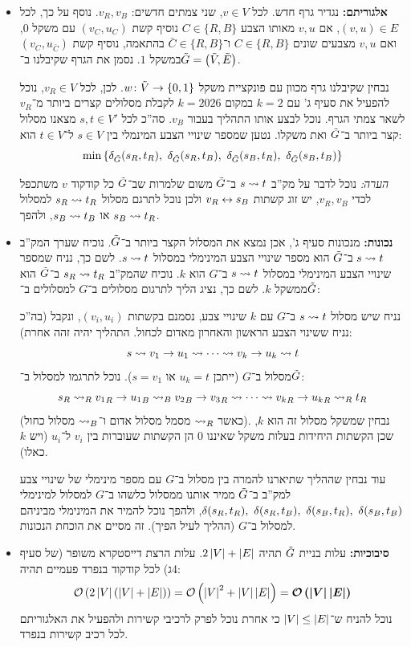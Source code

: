 \documentclass[]{../../../../tex/classes/homework}
\begin{document}
	\begin{itemize}
		\item \textbf{אלגוריתם: }נגדיר גרף חדש. לכל $v \in V$, שני צמתים חדשים: $v_R, v_B$. נוסף על כך, לכל $(v, u) \in E$, אם $v, u$ מאותו הצבע $C \in \{R, B\}$ נוסיף קשת $(v_C, u_C)$ עם משקל $0$, ואם $v, u$ מצבעים שונים $C \in \{R, B\}$ ו־$\bar C \in \{R, B\}$ בהתאמה, נוסיף קשת $(v_C, u_{\bar C})$ במשקל $1$. נסמן את הגרף שקיבלנו ב־$\tilde G = \left ( \tilde V, \tilde E \right )$. 
		
		נבחין שקיבלנו גרף מכוון עם פונקציית משקל $w \colon \tilde V \to \{0, 1\}$. לכן, לכל $v_R \in V$, נוכל להפעיל את סעיף ג' עם $k = 2$ במקום $k = 2026$ לקבלת מסלולים קצרים ביותר מ־$v_R$ לשאר צמתי הגרף. נוכל לבצע אותו התהליך בעבור $v_B$. סה''כ לכל $s, t \in V'$ מצאנו מסלול קצר ביותר ב־$\tilde G$ ואת משקלו. נטען שמספר שינויי הצבע המינמלי בין $s \in V$ ל־$t \in V$ הוא: 
		\[ \min\ccb{\dg_{\tl G}(s_R, t_R),\ \dg_{\tl G}(s_R, t_B),\ \dg_{\tl G}(s_B, t_R),\ \dg_{\tl G}(s_B, t_B)} \]
		
		\textit{הערה: }נוכל לדבר על מק''ב $s \rightsquigarrow t$ ב־$\tilde G$ משום שלמרות שב־$\tilde G$ כל קודקוד $v$ משתכפל לכדי $v_R, v_B$, יש זוג קשתות $v_R \leftrightarrow s_B$ ולכן נוכל לתרגם מסלול $s_R \rightsquigarrow t_R$ למסלול $s_B \rightsquigarrow t_R$ או $s_B \rightsquigarrow t_B$, ולהפך. 
		\item \textbf{נכונות: }מנכונות סעיף ג', אכן נמצא את המסלול הקצר ביותר ב־$\tilde G$. נוכיח שערך המק''ב $s \rightsquigarrow t$ ב־$\tilde G$ הוא מספר שינויי הצבע המינימלי במסלול $s \rightsquigarrow t$. 
		לשם כך, נניח שמספר שינויי הצבע המינימלי במסלול $s \rightsquigarrow t$ ב־$G$ הוא $k$. נוכיח שהמק''ב $s_R \rightsquigarrow t_R$ ב־$\tilde G$ הוא ממשקל $k$. לשם כך, נציג הליך לתרגום מסלולים ב־$G$ למסלולים ב־$\tilde G$: 
		
			 נניח שיש מסלול $s \rightsquigarrow t$ ב־$G$ עם $k$ שינויי צבע, נסמנם בקשתות $(v_i, u_i)$, ונקבל (בה''כ נניח ששינוי הצבע הראשון והאחרון מאדום לכחול. התהליך יהיה זהה אחרת): 
			\[ s \rightsquigarrow v_1 \to u_1 \rightsquigarrow \cdots \rightsquigarrow v_k \to u_k \rightsquigarrow t \]
			מסלול ב־$G$ (ייתכן $u_k = t$ או $s = v_1$). נוכל לתרגמו למסלול ב־$\tilde G$: 
			\[ s_R \rightsquigarrow_R {v_1}_R \to {u_1}_{B} \rightsquigarrow_B {v_2}_B \to {v_3}_R \rightsquigarrow \cdots \rightsquigarrow {v_k}_R \to {u_k}_R \rightsquigarrow_R t_R \]
			(כאשר $\rightsquigarrow_R$ מסמל מסלול אדום ו־$\rightsquigarrow_B$ מסלול כחול). נבחין שמשקל מסלול זה הוא $k$, שכן הקשתות היחידות בעלות משקל שאיננו $0$ הן הקשתות שעוברות בין $v_i$ ל־$u_i$ (ויש $k$ כאלו). 
			
			עוד נבחין שההליך שתיארנו להמרה בין מסלול ב־$G$ עם מספר מינימלי של שינויי צבע למק''ב ב־$\tilde G$ ממיר אותנו ממסלול כלשהו ב־$G$ למסלול למינימלי $\delta(s_R, t_R),\ \delta(s_R, t_B),\ \delta(s_B, t_R),\ \delta(s_B, t_B)$, ולהפך נוכל להמיר את המינימלי מביניהם למסלול ב־$G$ (ההליך לעיל הפיך). זה מסיים את הוכחת הנכונות. 
		\item \textbf{סיבוכיות: }עלות בניית $\tilde G$ תהיה $2 \left \lvert V \right \rvert + \left \lvert E \right \rvert$. עלות הרצת דייסטקרא משופר (של סעיף 4ג) לכל קודקוד בנפרד פעמיים תהיה: 
		\[ \mathcal{O}\left ( 2\left \lvert V \right \rvert \left ( \left \lvert V \right \rvert + \left \lvert E \right \rvert \right ) \right ) = \mathcal{O}\left ( \left \lvert V \right \rvert^{2} + \left \lvert V \right \rvert \left \lvert E \right \rvert \right ) = \bm{\mathcal{O}\left ( {\left \lvert V \right \rvert \left \lvert E \right \rvert} \right )} \]
		נוכל להניח ש־$\left \lvert V \right \rvert \le \left \lvert E \right \rvert$ כי אחרת נוכל לפרק לרכיבי קשירות ולהפעיל את האלגוריתם לכל רכיב קשירות בנפרד. 
	\end{itemize}
	
\end{document}
